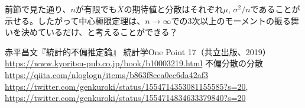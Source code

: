 \documentclass[uplatex,dvipdfmx]{jlreq}
\begin{document}
\begin{note}
    前節で見た通り、$n$が有限でも$\bar{X}$の期待値と分散はそれぞれ$\mu$, $\sigma^2/n$であることが示せる。したがって中心極限定理は、$n\to\infty$での3次以上のモーメントの振る舞いを決めているだけ、と考えることができる？
\end{note}

\begin{thebibliography}{9}
        赤平昌文『統計的不偏推定論』
        統計学One Point 17（共立出版、2019）
        \url{https://www.kyoritsu-pub.co.jp/book/b10003219.html}
        不偏分散の分散
        \url{https://qiita.com/nloglogn/items/b863f8cea0ec6da42af3}
        \url{https://twitter.com/genkuroki/status/1554714353081155585?s=20},\\
        \url{https://twitter.com/genkuroki/status/1554714834633379840?s=20}
\end{thebibliography}
\end{document}
